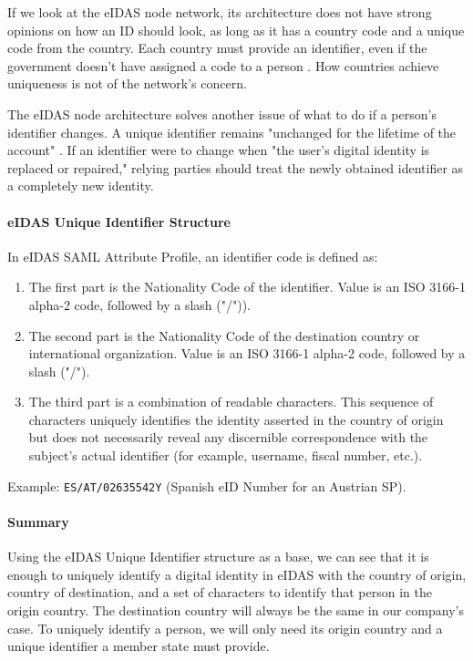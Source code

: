 If we look at the eIDAS node network, its architecture does not have strong opinions on how an ID should look, as long as it has a country code and a unique code from the country. Each country must provide an identifier, even if the government doesn't have assigned a code to a person \cite{eidas-saml}. How countries achieve uniqueness is not of the network's concern.

The eIDAS node architecture solves another issue of what to do if a person's identifier changes. A unique identifier remains "unchanged for the lifetime of the account" \cite{eidas-saml}. If an identifier were to change when "the user's digital identity is replaced or repaired," relying parties should treat the newly obtained identifier as a completely new identity.

\paragraph{eIDAS Unique Identifier Structure} In eIDAS SAML Attribute Profile, an identifier code is defined as:
\begin{enumerate}
  \item The first part is the Nationality Code of the identifier. Value is an ISO 3166-1 alpha-2 code, followed by a slash ("/")).
  \item The second part is the Nationality Code of the destination country or international organization. Value is an ISO 3166-1 alpha-2 code, followed by a slash ("/").
  \item The third part is a combination of readable characters. This sequence of characters uniquely identifies the identity asserted in the country of origin but does not necessarily reveal any discernible correspondence with the subject's actual identifier (for example, username, fiscal number, etc.).
\end{enumerate}

Example: \texttt{ES/AT/02635542Y} (Spanish eID Number for an Austrian SP).

\paragraph{Summary} Using the eIDAS Unique Identifier structure as a base, we can see that it is enough to uniquely identify a digital identity in eIDAS with the country of origin, country of destination, and a set of characters to identify that person in the origin country. The destination country will always be the same in our company's case. To uniquely identify a person, we will only need its origin country and a unique identifier a member state must provide.

